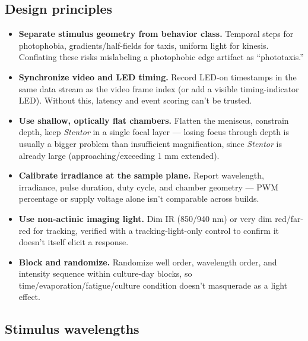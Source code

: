 \documentclass[
]{article}
\providecommand{\tightlist}{%
  \setlength{\itemsep}{0pt}\setlength{\parskip}{0pt}}
\begin{document}
\hypertarget{design-principles}{%
\subsection{Design principles}\label{design-principles}}

\begin{itemize}
\tightlist
\item
  \textbf{Separate stimulus geometry from behavior class.} Temporal
  steps for photophobia, gradients/half-fields for taxis, uniform light
  for kinesis. Conflating these risks mislabeling a photophobic edge
  artifact as ``phototaxis.''
\item
  \textbf{Synchronize video and LED timing.} Record LED-on timestamps in
  the same data stream as the video frame index (or add a visible
  timing-indicator LED). Without this, latency and event scoring can't
  be trusted.
\item
  \textbf{Use shallow, optically flat chambers.} Flatten the meniscus,
  constrain depth, keep \emph{Stentor} in a single focal layer ---
  losing focus through depth is usually a bigger problem than
  insufficient magnification, since \emph{Stentor} is already large
  (approaching/exceeding 1 mm extended).
\item
  \textbf{Calibrate irradiance at the sample plane.} Report wavelength,
  irradiance, pulse duration, duty cycle, and chamber geometry --- PWM
  percentage or supply voltage alone isn't comparable across builds.
\item
  \textbf{Use non-actinic imaging light.} Dim IR (850/940 nm) or very
  dim red/far-red for tracking, verified with a tracking-light-only
  control to confirm it doesn't itself elicit a response.
\item
  \textbf{Block and randomize.} Randomize well order, wavelength order,
  and intensity sequence within culture-day blocks, so
  time/evaporation/fatigue/culture condition doesn't masquerade as a
  light effect.
\end{itemize}

\hypertarget{stimulus-wavelengths}{%
\subsection{Stimulus wavelengths}\label{stimulus-wavelengths}}
\end{document}
